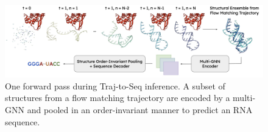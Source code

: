 \begin{figure}[ht]
    \centering
    \includegraphics[width=2\columnwidth]{traj-to-seq.png}
    \caption{One forward pass during Traj-to-Seq inference. A subset of structures from a flow matching trajectory are encoded by a multi-GNN and pooled in an order-invariant manner to predict an RNA sequence.}
    \label{fig:2}
\end{figure}

